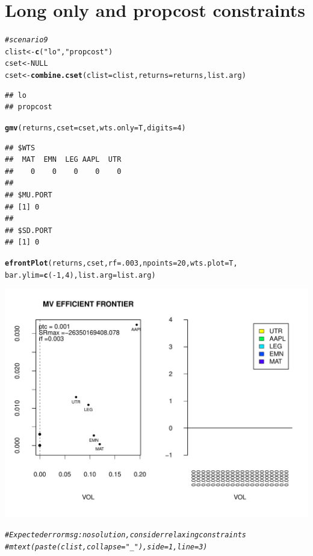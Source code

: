 \documentclass{uwstat518}\usepackage[]{graphicx}\usepackage[]{color}
\makeatletter
\def\maxwidth{ %
  \ifdim\Gin@nat@width>\linewidth
    \linewidth
  \else
    \Gin@nat@width
  \fi
}
\newcommand{\hlstr}[1]{\textcolor[rgb]{0.192,0.494,0.8}{#1}}%
\newcommand{\hlcom}[1]{\textcolor[rgb]{0.678,0.584,0.686}{\textit{#1}}}%
\newcommand{\hlkwd}[1]{\textcolor[rgb]{0.737,0.353,0.396}{\textbf{#1}}}%
\newenvironment{kframe}{%
 \def\at@end@of@kframe{}%
 \ifinner\ifhmode%
  \def\at@end@of@kframe{\end{minipage}}%
  \begin{minipage}{\columnwidth}%
 \fi\fi%
 \def\FrameCommand##1{\hskip\@totalleftmargin \hskip-\fboxsep
 \colorbox{shadecolor}{##1}\hskip-\fboxsep
     \hskip-\linewidth \hskip-\@totalleftmargin \hskip\columnwidth}%
 \MakeFramed {\advance\hsize-\width
   \@totalleftmargin\z@ \linewidth\hsize
   \@setminipage}}%
 {\par\unskip\endMakeFramed%
 \at@end@of@kframe}
\newenvironment{knitrout}{}{} %
\makeatother
\begin{document}
\newpage
\section{Long only and propcost constraints}
\begin{knitrout}
\color{fgcolor}\begin{kframe}
\begin{alltt}
\hlcom{# scenario 9 }
clist <- \hlkwd{c}(\hlstr{"lo"},\hlstr{"propcost"})
cset <- NULL
cset <-\hlkwd{combine.cset}(clist=clist,returns=returns,list.arg)
\end{alltt}
\begin{verbatim}
## lo 
## propcost
\end{verbatim}
\begin{alltt}
\hlkwd{gmv}(returns, cset=cset, wts.only=T,digits=4)
\end{alltt}
\begin{verbatim}
## $WTS
##  MAT  EMN  LEG AAPL  UTR 
##    0    0    0    0    0 
## 
## $MU.PORT
## [1] 0
## 
## $SD.PORT
## [1] 0
\end{verbatim}
\begin{alltt}

\hlkwd{efrontPlot}(returns, cset, rf = .003, npoints = 20,wts.plot = T,
		bar.ylim = \hlkwd{c}(-1,4),list.arg=list.arg)
\end{alltt}


{\ttfamily\noindent\color{warningcolor}{\#\# Warning: consider possibly relaxing constraints}}\end{kframe}
\includegraphics[width=\maxwidth]{figure/unnamed-chunk-12} 
\begin{kframe}\begin{alltt}

\hlcom{# Expected error msg: no solution, consider relaxing constraints}
\hlcom{#mtext(paste(clist,collapse="_"),side=1,line=3)}
\end{alltt}
\end{kframe}
\end{knitrout}
\end{document}
